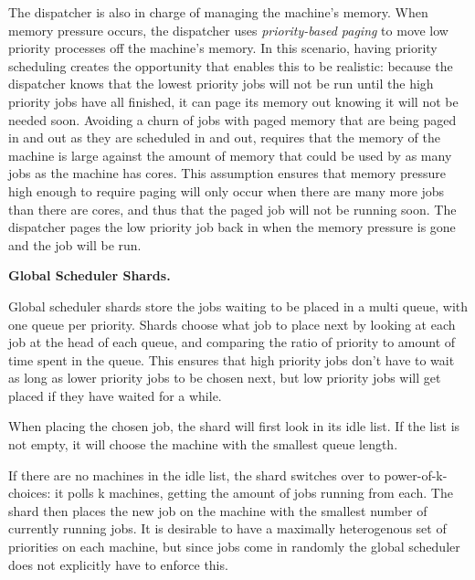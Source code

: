 The dispatcher is also in charge of managing the machine's memory. When memory
pressure occurs, the dispatcher uses \textit{priority-based paging} to move low
priority processes off the machine's memory. In this scenario, having priority
scheduling creates the opportunity that enables this to be realistic: because
the dispatcher knows that the lowest priority jobs will not be run until the
high priority jobs have all finished, it can page its memory out knowing it will
not be needed soon. Avoiding a churn of jobs with paged memory that are being
paged in and out as they are scheduled in and out, requires that the memory of
the machine is large against the amount of memory that could be used by as many
jobs as the machine has cores. This assumption ensures that memory pressure high
enough to require paging will only occur when there are many more jobs than
there are cores, and thus that the paged job will not be running soon. The
dispatcher pages the low priority job back in when the memory pressure is gone
and the job will be run.



\textbf{Global Scheduler Shards.}

Global scheduler shards store the jobs waiting to be placed in a multi queue,
with one queue per priority. Shards choose what job to place next by looking at
each job at the head of each queue, and comparing the ratio of priority to
amount of time spent in the queue. This ensures that high priority jobs don't
have to wait as long as lower priority jobs to be chosen next, but low priority
jobs will get placed if they have waited for a while.

When placing the chosen job, the shard will first look in its idle list. If the
list is not empty, it will choose the machine with the smallest queue length.

If there are no machines in the idle list, the shard switches over to
power-of-k-choices: it polls k machines, getting the amount of jobs running from
each. The shard then places the new job on the machine with the smallest number
of currently running jobs. It is desirable to have a maximally heterogenous set
of priorities on each machine, but since jobs come in randomly the global
scheduler does not explicitly have to enforce this.
